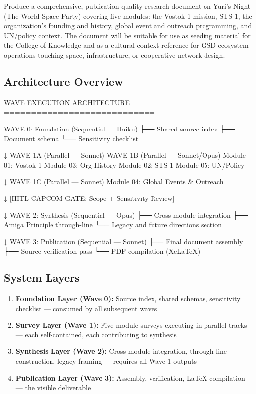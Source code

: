 \documentclass[11pt,letterpaper]{article}
\begin{document}
Produce a comprehensive, publication-quality research document on Yuri's Night (The World Space Party) covering five modules: the Vostok 1 mission, STS-1, the organization's founding and history, global event and outreach programming, and UN/policy context. The document will be suitable for use as seeding material for the College of Knowledge and as a cultural context reference for GSD ecosystem operations touching space, infrastructure, or cooperative network design.

\subsection{Architecture Overview}

\begin{asciibox}
WAVE EXECUTION ARCHITECTURE
============================

WAVE 0: Foundation (Sequential — Haiku)
  ├── Shared source index
  ├── Document schema
  └── Sensitivity checklist

        ↓
WAVE 1A (Parallel — Sonnet)       WAVE 1B (Parallel — Sonnet/Opus)
  Module 01: Vostok 1               Module 03: Org History
  Module 02: STS-1                  Module 05: UN/Policy

        ↓
WAVE 1C (Parallel — Sonnet)
  Module 04: Global Events & Outreach

        ↓
[HITL CAPCOM GATE: Scope + Sensitivity Review]

        ↓
WAVE 2: Synthesis (Sequential — Opus)
  ├── Cross-module integration
  ├── Amiga Principle through-line
  └── Legacy and future directions section

        ↓
WAVE 3: Publication (Sequential — Sonnet)
  ├── Final document assembly
  ├── Source verification pass
  └── PDF compilation (XeLaTeX)
\end{asciibox}

\subsection{System Layers}

\begin{enumerate}[leftmargin=*]
  \item \textbf{Foundation Layer (Wave 0):} Source index, shared schemas, sensitivity checklist — consumed by all subsequent waves
  \item \textbf{Survey Layer (Wave 1):} Five module surveys executing in parallel tracks — each self-contained, each contributing to synthesis
  \item \textbf{Synthesis Layer (Wave 2):} Cross-module integration, through-line construction, legacy framing — requires all Wave 1 outputs
  \item \textbf{Publication Layer (Wave 3):} Assembly, verification, LaTeX compilation — the visible deliverable
\end{enumerate}
\end{document}
